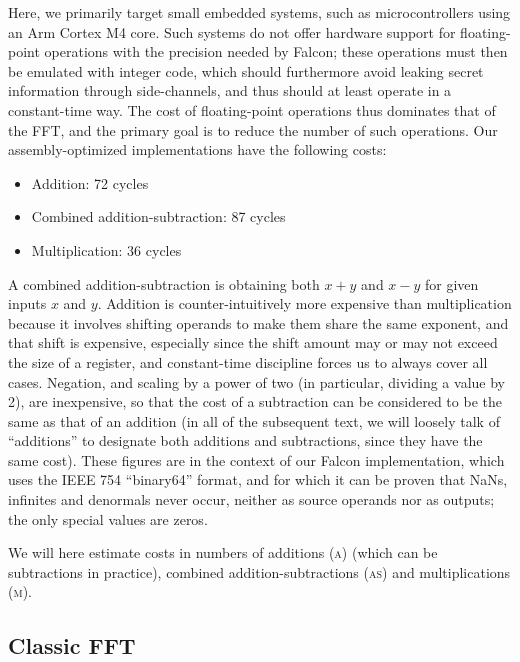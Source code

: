 \documentclass{llncs}
\begin{document}
Here, we primarily target small embedded systems, such as
microcontrollers using an Arm Cortex M4 core. Such systems do not offer
hardware support for floating-point operations with the precision needed
by Falcon; these operations must then be emulated with integer code,
which should furthermore avoid leaking secret information through
side-channels, and thus should at least operate in a constant-time way.
The cost of floating-point operations thus dominates that of the FFT,
and the primary goal is to reduce the number of such operations. Our
assembly-optimized implementations have the following costs:
\begin{itemize}

    \item Addition: 72 cycles

    \item Combined addition-subtraction: 87 cycles

    \item Multiplication: 36 cycles

\end{itemize}
A combined addition-subtraction is obtaining both $x + y$ and $x - y$
for given inputs $x$ and $y$. Addition is counter-intuitively more
expensive than multiplication because it involves shifting operands to
make them share the same exponent, and that shift is expensive,
especially since the shift amount may or may not exceed the size of a
register, and constant-time discipline forces us to always cover all
cases. Negation, and scaling by a power of two (in particular, dividing
a value by 2), are inexpensive, so that the cost of a subtraction can be
considered to be the same as that of an addition (in all of the
subsequent text, we will loosely talk of ``additions'' to designate both
additions and subtractions, since they have the same cost). These
figures are in the context of our Falcon implementation, which uses the
IEEE 754 ``binary64'' format, and for which it can be proven that NaNs,
infinites and denormals never occur, neither as source operands nor as
outputs; the only special values are zeros.

We will here estimate costs in numbers of additions (\textsc{a}) (which
can be subtractions in practice), combined addition-subtractions
(\textsc{as}) and multiplications (\textsc{m}).

\subsection{Classic FFT}
\end{document}
